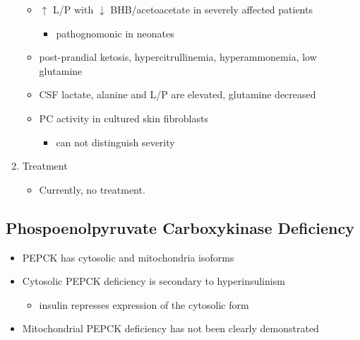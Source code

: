 \documentclass{scrartcl}
\begin{document}
\begin{enumerate}
\begin{itemize}
\item \(\uparrow\) L/P with \(\downarrow\) BHB/acetoacetate in severely affected patients
\begin{itemize}
\item pathognomonic in neonates
\end{itemize}

\item post-prandial ketosis, hypercitrullinemia, hyperammonemia, low glutamine

\item CSF lactate, alanine and L/P are elevated, glutamine decreased

\item PC activity in cultured skin fibroblasts
\begin{itemize}
\item can not distinguish severity
\end{itemize}
\end{itemize}

\item Treatment
\label{sec:org415a7a3}

\begin{itemize}
\item Currently, no treatment.
\end{itemize}
\end{enumerate}

\subsection{Phospoenolpyruvate Carboxykinase Deficiency}
\label{sec:orgd9d4f50}
\begin{itemize}
\item PEPCK has cytosolic and mitochondria isoforms
\item Cytosolic PEPCK deficiency is secondary to hyperinsulinism
\begin{itemize}
\item insulin represses expression of the cytosolic form
\end{itemize}
\item Mitochondrial PEPCK deficiency has not been clearly demonstrated
\end{itemize}
\end{document}
